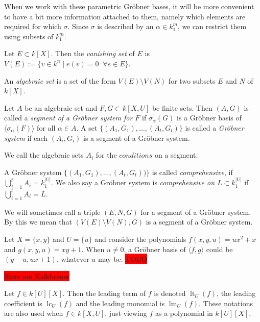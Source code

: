\documentclass[a4paper, 12pt]{article}
\DeclareMathOperator{\LT}{lt}
\DeclareMathOperator{\LM}{lm}
\DeclareMathOperator{\LC}{lc}
\theoremstyle{changedot}
\theoremstyle{changedotbreak}
\theoremstyle{nonumberplain}
\begin{document}
When we work with these parametric Gröbner bases, it will be more convenient to have a bit more information attached to them, namely which elements are required for which $\sigma$. Since $\sigma$ is described by an $\alpha \in k_{1}^{m}$, we can restrict them using subsets of $k_{1}^{m}$.

\begin{definition}
  Let $E \subset k[X]$. Then the \textit{vanishing set} of $E$ is $V(E) := \{v \in k^{n} \mid e(v) = 0 \;\; \forall e \in E\}$.

  An \textit{algebraic set} is a set of the form $V(E) \setminus V(N)$ for two subsets $E$ and $N$ of $k[X]$.
\end{definition}

\begin{definition}
  Let $A$ be an algebraic set and $F, G \subset k[X, U]$ be finite sets. Then $(A, G)$ is called a \textit{segment of a Gröbner system for $F$} if $\sigma_{\alpha}(G)$ is a Gröbner basis of $\langle \sigma_{\alpha}(F) \rangle$ for all $\alpha \in A$. A set $\{(A_{1}, G_{1}), \dots, (A_{t}, G_{t})\}$ is called a \textit{Gröbner system} if each $(A_{i}, G_{i})$ is a segment of a Gröbner system.

  We call the algebraic sets $A_{i}$ for the $\textit{conditions}$ on a segment.

  A Gröbner system $\{(A_{1}, G_{1}), \dots, (A_{t}, G_{t}))\}$ is called \textit{comprehensive}, if $\bigcup_{i=1}^{t}A_{i} = k_{1}^{|U|}$. We also say a Gröbner system is \textit{comprehensive on $L \subset k_{1}^{|U|}$} if $\bigcup_{i=1}^{t}A_{i} = L$.
\end{definition}

We will sometimes call a triple $(E, N, G)$ for a segment of a Gröbner system. By this we mean that $(V(E) \setminus V(N), G)$ is a segment of a Gröbner system.

\begin{example}
  Let $X = \{x, y\}$ and $U = \{u\}$ and consider the polynomials $f(x, y, u) = ux^{2} + x$ and $g(x, y, u) = xy + 1$. When $u \neq 0$, a Gröbner basis of $\langle f, g \rangle$ could be $(y-u, ux + 1)$, whatever $u$ may be. \colorbox{red}{TODO}
\end{example}

\colorbox{red}{Skriv om Kalkbrener}
\begin{definition}
  Let $f \in k[U][X]$. Then the leading term of $f$ is denoted $\LT_{U}(f)$, the leading coefficient is $\LC_{U}(f)$ and the leading monomial is $\LM_{U}(f)$. These notations are also used when $f \in k[X, U]$, just viewing $f$ as a polynomial in $k[U][X]$.
\end{definition}
\end{document}
